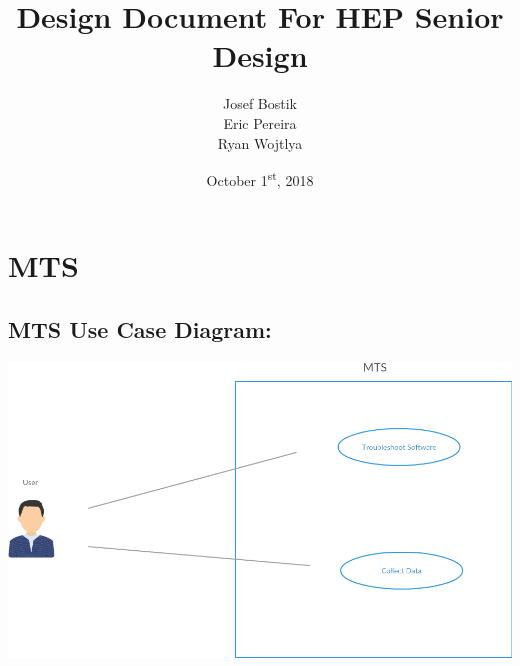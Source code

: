 \documentclass[12pt]{article}
\begin{document}
\begin{titlepage}
	

\author{Josef Bostik\\
	Eric Pereira\\
	Ryan Wojtlya\\}
\date{October 1\textsuperscript{st}, 2018}
\title{Design Document For HEP Senior Design}
\maketitle
\end{titlepage}
\tableofcontents
\newpage
{}

\section*{MTS}
%
\subsection*{MTS Use Case Diagram:} 
%
\graphicspath{{./Images/}}
\includegraphics[scale=0.69]{MTS.png}
\newline
\end{document}
